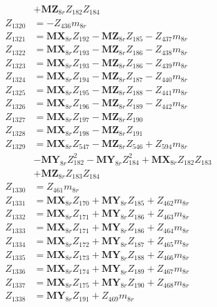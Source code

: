 \begin{multicols}{2}
\begin{align}
&+ \mathbf{MZ}_{8r}Z_{182}Z_{184} \nonumber \\
Z_{1320} &= -Z_{436}m_{8r} \nonumber \\
Z_{1321} &= \mathbf{MX}_{8r}Z_{192} - \mathbf{MZ}_{8r}Z_{185} - Z_{437}m_{8r} \nonumber \\
Z_{1322} &= \mathbf{MX}_{8r}Z_{193} - \mathbf{MZ}_{8r}Z_{186} - Z_{438}m_{8r} \nonumber \\
Z_{1323} &= \mathbf{MX}_{8r}Z_{193} - \mathbf{MZ}_{8r}Z_{186} - Z_{439}m_{8r} \nonumber \\
Z_{1324} &= \mathbf{MX}_{8r}Z_{194} - \mathbf{MZ}_{8r}Z_{187} - Z_{440}m_{8r} \nonumber \\
Z_{1325} &= \mathbf{MX}_{8r}Z_{195} - \mathbf{MZ}_{8r}Z_{188} - Z_{441}m_{8r} \nonumber \\
Z_{1326} &= \mathbf{MX}_{8r}Z_{196} - \mathbf{MZ}_{8r}Z_{189} - Z_{442}m_{8r} \nonumber \\
Z_{1327} &= \mathbf{MX}_{8r}Z_{197} - \mathbf{MZ}_{8r}Z_{190} \nonumber \\
Z_{1328} &= \mathbf{MX}_{8r}Z_{198} - \mathbf{MZ}_{8r}Z_{191} \nonumber \\
Z_{1329} &= \mathbf{MX}_{8r}Z_{547} - \mathbf{MZ}_{8r}Z_{546} + Z_{594}m_{8r}  \nonumber \\
&- \mathbf{MY}_{8r}Z_{182}^2 - \mathbf{MY}_{8r}Z_{184}^2 + \mathbf{MX}_{8r}Z_{182}Z_{183}  \nonumber \\
&+ \mathbf{MZ}_{8r}Z_{183}Z_{184} \nonumber \\
Z_{1330} &= Z_{461}m_{8r} \nonumber \\
Z_{1331} &= \mathbf{MX}_{8r}Z_{170} + \mathbf{MY}_{8r}Z_{185} + Z_{462}m_{8r} \nonumber \\
Z_{1332} &= \mathbf{MX}_{8r}Z_{171} + \mathbf{MY}_{8r}Z_{186} + Z_{463}m_{8r} \nonumber \\
Z_{1333} &= \mathbf{MX}_{8r}Z_{171} + \mathbf{MY}_{8r}Z_{186} + Z_{464}m_{8r} \nonumber \\
Z_{1334} &= \mathbf{MX}_{8r}Z_{172} + \mathbf{MY}_{8r}Z_{187} + Z_{465}m_{8r} \nonumber \\
Z_{1335} &= \mathbf{MX}_{8r}Z_{173} + \mathbf{MY}_{8r}Z_{188} + Z_{466}m_{8r} \nonumber \\
Z_{1336} &= \mathbf{MX}_{8r}Z_{174} + \mathbf{MY}_{8r}Z_{189} + Z_{467}m_{8r} \nonumber \\
Z_{1337} &= \mathbf{MX}_{8r}Z_{175} + \mathbf{MY}_{8r}Z_{190} + Z_{468}m_{8r} \nonumber \\
Z_{1338} &= \mathbf{MY}_{8r}Z_{191} + Z_{469}m_{8r} \nonumber \\

\end{align}
\end{multicols}
